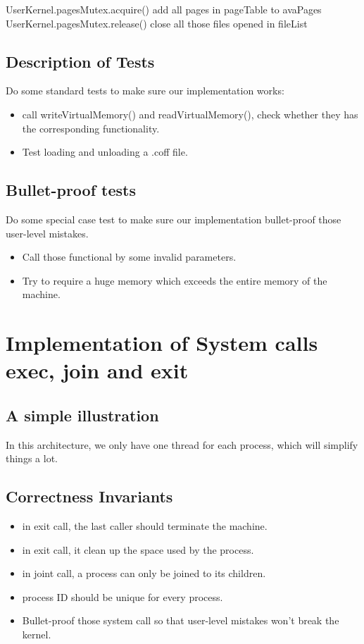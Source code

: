 \documentclass{article}
\begin{document}
    \begin{algorithm}[H]
		\begin{algorithmic}
			\State UserKernel.pagesMutex.acquire()
			\State add all pages in pageTable to avaPages
			\State UserKernel.pagesMutex.release()
			\State close all those files opened in fileList
			\EndProcedure
		\end{algorithmic}
	\end{algorithm}
	\subsection{Description of Tests}
	Do some standard tests to make sure our implementation works:
	
	\begin{itemize}
		\item call writeVirtualMemory() and readVirtualMemory(), check whether they has the corresponding functionality.
		\item Test loading and unloading a .coff file.
	\end{itemize}
	
	\subsection*{Bullet-proof tests}
	Do some special case test to make sure our implementation bullet-proof those user-level mistakes.
	
	\begin{itemize}
		\item Call those functional by some invalid parameters.
		\item Try to require a huge memory which exceeds the entire memory of the machine.
	\end{itemize}
	\section{Implementation of System calls exec, join and exit}
	\subsection{A simple illustration}
	In this architecture, we only have one thread for each process, which will simplify things a lot.
	\subsection{Correctness Invariants}
	\begin{itemize}
		\item in exit call, the last caller should terminate the machine.
		\item in exit call, it clean up the space used by the process.
		\item in joint call, a process can only be joined to its children.
		\item process ID should be unique for every process.
		\item Bullet-proof those system call so that user-level mistakes won't break the kernel.
	\end{itemize}
\end{document}
